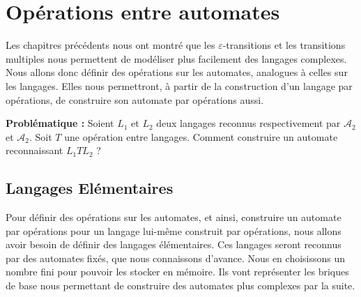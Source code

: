 \chapter{Opérations entre automates}

\minitoc %

\setlength{\parindent}{0pt}
\renewcommand{\labelitemi}{\textbullet} %



Les chapitres précédents nous ont montré que les $\varepsilon$-transitions et les transitions multiples 
nous permettent de modéliser plus facilement des langages complexes. 
Nous allons donc définir des opérations sur les automates, analogues à celles sur les langages. 
Elles nous permettront, à partir de la construction d'un langage par opérations, de construire son automate par 
opérations aussi. 

\vspace{0.3cm}

\textbf{Problématique : } Soient $L_1$ et $L_2$ deux langages reconnus respectivement par $ \mathcal{A}_2$ et $ \mathcal{A}_2$. 
Soit $T$ une opération entre langages. Comment construire un automate reconnaissant $L_1 T L_2$ ? 


\section{Langages Elémentaires}

Pour définir des opérations sur les automates, et ainsi, construire un automate par opérations pour un langage 
lui-même construit par opérations, nous allons avoir besoin de définir des langages élémentaires. 
Ces langages seront reconnus par des automates fixés, que nous connaissons d'avance. Nous en choisissons un nombre fini 
pour pouvoir les stocker en mémoire. Ils vont représenter les briques de base nous permettant de construire des automates plus 
complexes par la suite. 

